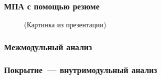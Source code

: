 \documentclass[14pt]{beamer}
\begin{document}
\begin{frame}
\frametitle{МПА с помощью резюме}
\begin{figure}[h]
(Картинка из презентации)
\end{figure}
\end{frame}

\begin{frame}
\frametitle{Межмодульный анализ}
\begin{figure}[h]
\end{figure}
\end{frame}


\begin{frame}
\frametitle{Покрытие~--- внутримодульный анализ}
\begin{figure}[h]
\end{figure}
\end{frame}
\end{document}
